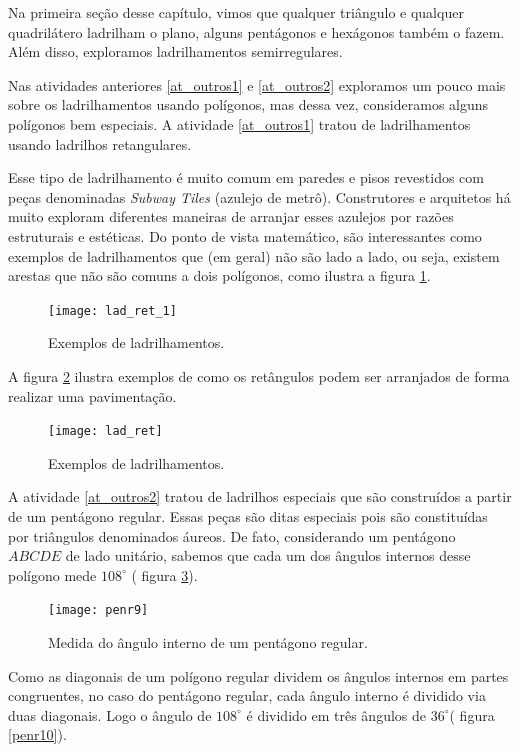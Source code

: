 

Na primeira seção desse capítulo, vimos que qualquer triângulo e qualquer quadrilátero ladrilham o plano, alguns pentágonos e hexágonos também o fazem. Além disso, exploramos ladrilhamentos semirregulares. 

Nas atividades anteriores \ref{at_outros1} e \ref{at_outros2}   exploramos um pouco mais sobre os ladrilhamentos usando polígonos, mas dessa vez, consideramos alguns polígonos bem especiais. A  atividade  \ref{at_outros1} tratou de ladrilhamentos usando ladrilhos retangulares.

Esse tipo de ladrilhamento é muito comum em  paredes e pisos revestidos com peças denominadas \textit{Subway Tiles }(azulejo de metrô). Construtores e arquitetos  há muito exploram diferentes maneiras de arranjar esses azulejos por razões estruturais e estéticas. Do ponto de vista  matemático, são interessantes como exemplos de ladrilhamentos que (em geral) não são  lado a lado, ou seja, existem arestas que não são comuns a dois polígonos, como ilustra a figura \ref{lad_ret1}.

\begin{figure}[H]
	\centering
	\texttt{[image: lad\_ret\_1]}
	\label{lad_ret1}
\caption{Exemplos de ladrilhamentos.}
	\end{figure}


A figura \ref{lad_ret} ilustra exemplos de como os retângulos podem ser arranjados de forma realizar uma pavimentação.
 \begin{figure}[H]
	\centering
	\texttt{[image: lad\_ret]}
	\label{lad_ret}
\caption{Exemplos de ladrilhamentos.}
	\end{figure}

A atividade \ref{at_outros2} tratou de ladrilhos especiais que são construídos a partir de um pentágono regular. Essas peças são ditas especiais pois são constituídas por triângulos denominados áureos. De fato, considerando  um pentágono $ABCDE$ de lado unitário, sabemos que cada um dos ângulos internos desse polígono mede $108^{\circ}$ ( figura \ref{penr_9}). 

\begin{figure}[H]
	\centering
	\texttt{[image: penr9]}
	\label{penr_9}
\caption{Medida do ângulo interno de um pentágono regular.}
	\end{figure}


Como as diagonais de um polígono regular dividem os ângulos internos em partes congruentes, no caso do pentágono regular, cada ângulo interno é dividido via duas diagonais. Logo o ângulo de  $108^{\circ}$ é dividido em três ângulos de $36^{\circ}$( figura \ref{penr10}). 


